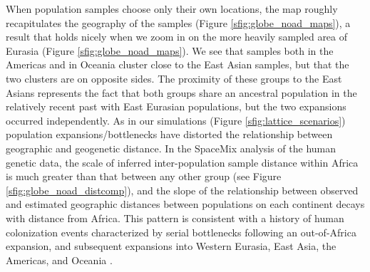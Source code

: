 \documentclass[12pt]{article}
\begin{document}
When population samples choose only their own locations, the map roughly recapitulates the geography of the samples (Figure \ref{sfig:globe_noad_maps}), a result that holds nicely when we zoom in on the more heavily sampled area of Eurasia (Figure \ref{sfig:globe_noad_maps}). We see that samples both in the Americas and in Oceania cluster close to the East Asian samples, but that the two clusters are on opposite sides.  The proximity of these groups to the East Asians represents the fact that both groups share an ancestral population in the relatively recent past with East Eurasian populations, but the two expansions occurred independently. As in our simulations (Figure \ref{sfig:lattice_scenarios}) population expansions/bottlenecks have distorted the relationship between geographic and geogenetic distance. In the SpaceMix analysis of the human genetic data, the scale of inferred inter-population sample distance within Africa is much greater than that between any other group (see Figure \ref{sfig:globe_noad_distcomp}), and the slope of the relationship between observed and estimated geographic distances between populations on each continent decays with distance from Africa.  This pattern is consistent with a history of human colonization events characterized by serial bottlenecks \citep{Harpending_Rogers_2000,prugnolle_geography_2005,Ramachandran:05} following an out-of-Africa expansion, and subsequent expansions into Western Eurasia, East Asia, the Americas, and Oceania \citep[but see][for a discussion of other models]{pickrell_reich:14}. 
\end{document}
